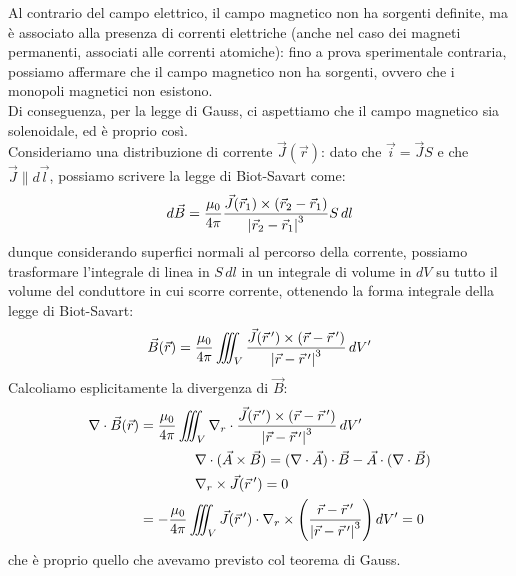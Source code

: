 \documentclass[]{article}
\begin{document}
Al contrario del campo elettrico, il campo magnetico non ha sorgenti definite, ma è associato alla presenza di correnti elettriche (anche nel caso dei magneti permanenti, associati alle correnti atomiche): fino a prova sperimentale contraria, possiamo affermare che il campo magnetico non ha sorgenti, ovvero che i monopoli magnetici non esistono. \\ 
%
Di conseguenza, per la legge di Gauss, ci aspettiamo che il campo magnetico sia solenoidale, ed è proprio così. \\ 
%
Consideriamo una distribuzione di corrente $ \vec{J}(\vec{r}) $: dato che $ \vec{i} = \vec{J} S $ e che $ \vec{J} \parallel d\vec{l} $, possiamo scrivere la legge di Biot-Savart come:
\begin{equation}
	d\vec{B} = \displaystyle\frac{\mu_0}{4\pi} \displaystyle\frac{\vec{J}(\vec{r}_1) \times (\vec{r}_2 - \vec{r}_1)}{\left\lvert\vec{r}_2 - \vec{r}_1\right\rvert^3} S \, dl 
	\label{eq:bio-savart-2}
\end{equation}
dunque considerando superfici normali al percorso della corrente, possiamo trasformare l'integrale di linea in $ S\,dl $ in un integrale di volume in $ dV $ su tutto il volume del conduttore in cui scorre corrente, ottenendo la forma integrale della legge di Biot-Savart:
\begin{equation}
	\vec{B}(\vec{r}) = \displaystyle\frac{\mu_0}{4\pi} \iiint_V \displaystyle\frac{\vec{J}(\vec{r}\,') \times (\vec{r} - \vec{r}\,')}{\left\lvert\vec{r} - \vec{r}\,'\right\rvert^3} \, dV'
	\label{eq:bio-savart-int}
\end{equation}
Calcoliamo esplicitamente la divergenza di $ \vec{B} $:
\begin{equation}
	\begin{split}
		\nabla\cdot\vec{B}(\vec{r}) &= \displaystyle\frac{\mu_0}{4\pi} \iiint_V \nabla_r \cdot \displaystyle\frac{\vec{J}(\vec{r}\,') \times (\vec{r} - \vec{r}\,')}{\left\lvert\vec{r} - \vec{r}\,'\right\rvert^3} \, dV' \\ 
				      & \qquad\qquad \nabla\cdot (\vec{A}\times\vec{B}) = (\nabla\cdot\vec{A})\cdot\vec{B} - \vec{A}\cdot (\nabla\cdot\vec{B}) \\ 
				      & \qquad\qquad \nabla_r \times\vec{J}(\vec{r}\,') = 0 \\ 
				      &= -\displaystyle\frac{\mu_0}{4\pi} \iiint_V \vec{J}(\vec{r}\,') \cdot \nabla_r \times \left(\displaystyle\frac{\vec{r} - \vec{r}\,'}{\left\lvert\vec{r} - \vec{r}\,'\right\rvert^3}\right) dV' = 0
	\end{split}
	\label{eq:}
\end{equation}
che è proprio quello che avevamo previsto col teorema di Gauss.
\end{document}
